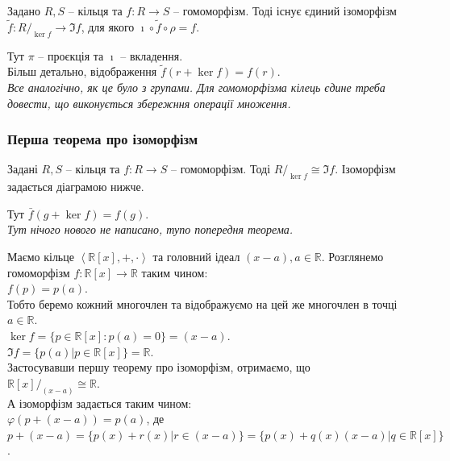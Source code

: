 \documentclass{math_library}
\begin{document}
\begin{theorem}
Задано $R,S$ -- кільця та $f \colon R \to S$ -- гомоморфізм. Тоді існує єдиний ізоморфізм $\tilde{f} \colon R/_{\ker f} \to \Im f$, для якого $\imath \circ \tilde{f} \circ \rho = f$.
\begin{figure}[H]
\centering
{}
\end{figure}
Тут $\pi$ -- проєкція та $\imath$ -- вкладення.\\
Більш детально, відображення $\tilde{f}(r+ \ker f) = f(r)$.\\
\textit{Все аналогічно, як це було з групами. Для гомоморфізма кілець єдине треба довести, що виконується збережння операції множення.}
\end{theorem}

\subsubsection{Перша теорема про ізоморфізм}
\begin{theorem}
Задані $R,S$ -- кільця та $f \colon R \to S$ -- гомоморфізм. Тоді ${R}/_{\ker f} \cong \Im f$. Ізоморфізм задається діаграмою нижче.
\begin{figure}[H]
\centering
{}
\end{figure}
Тут $\bar{f}(g + \ker f) = f(g)$.\\
\textit{Тут нічого нового не написано, тупо попередня теорема.}
\end{theorem}

\begin{example}
Маємо кільце $\left< \mathbb{R}[x],+,\cdot \right>$ та головний ідеал $(x-a), a \in \mathbb{R}$. Розглянемо гомоморфізм $f \colon \mathbb{R}[x] \to \mathbb{R}$ таким чином:\\
$f(p) = p(a)$.\\
Тобто беремо кожний многочлен та відображуємо на цей же многочлен в точці $a \in \mathbb{R}$.\\
$\ker f = \{ p \in \mathbb{R}[x]: p(a) = 0 \} = (x-a)$.\\
$\Im f = \{ p(a) | p \in \mathbb{R}[x] \} = \mathbb{R}$.\\
Застосувавши першу теорему про ізоморфізм, отримаємо, що \\ $\mathbb{R}[x]/_{(x-a)} \cong \mathbb{R}$.\\
А ізоморфізм задається таким чином:\\
$\varphi(p + (x-a)) = p(a)$, де\\
$p + (x-a) = \{p(x) + r(x) | r \in (x-a)\} = \{p(x) + q(x)(x-a) | q \in \mathbb{R}[x] \}$.
\end{example}
\end{document}
